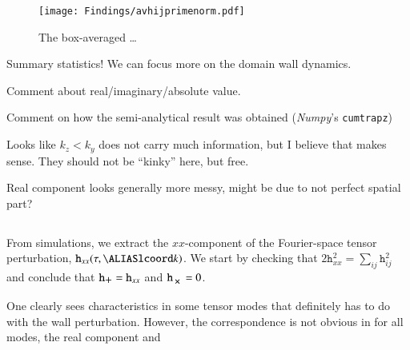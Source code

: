 \begin{figure}[h]
    \centering
    \texttt{[image: Findings/avhijprimenorm.pdf]}
    \caption{The box-averaged \dots{}}
    \label{fig:results:h11:avhijprimenorm}
\end{figure}




\begin{bullets}
    \item Summary statistics! We can focus more on the domain wall dynamics. 
    \item Comment about real/imaginary/absolute value.
    \item Comment on how the semi-analytical result was obtained (\textit{Numpy}'s  \texttt{cumtrapz})
    \item Looks like $k_z < k_y$ does not carry much information, but I believe that makes sense. They should not be ``kinky'' here, but free.
    \item Real component looks generally more messy, might be due to not perfect spatial part?
\end{bullets}






\subsection{}
    From simulations, we extract the $xx$-component of the Fourier-space tensor perturbation, $\mathtt{h}_{xx}(\tau, \lcoord{k})$. We start by checking that $2\mathtt{h}_{xx}^2 = \sum_{ij}\mathtt{h}_{ij}^2$ and conclude that $\mathtt{h}_{\polplus}=\mathtt{h}_{xx}$ and $\mathtt{h}_{\polcross}=0$. 


    One clearly sees characteristics in some tensor modes that definitely has to do with the wall perturbation. However, the correspondence is not obvious in for all modes, the real component and \blahblah







